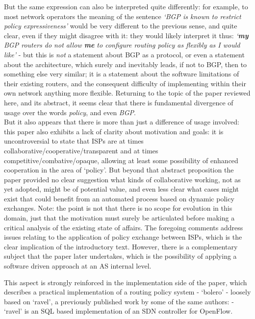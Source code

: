 But the same expression can also be interpreted quite differently: for example,
to most network operators the meaning of the sentence
\textit{`BGP is known to restrict policy expressiveness'}
would be very different to the previous sense, and quite clear, even if they
might disagree with it: they would likely interpret it thus:
\textit{`\textbf{my} BGP routers do not allow \textbf{me} to configure routing
	policy as flexibly as I would like'} - but this is \textit{not} a
statement
about BGP as a protocol, or even a statement about the architecture, which
surely and inevitably leads, if not to BGP, then to something else very
similar; it is a statement about the software limitations of their existing
routers, and the consequent difficulty of implementing within their own network
anything more flexible.
Returning to the topic of the paper reviewed here, and its abstract, it seems clear that
there is fundamental divergence of usage over the words \textit{policy}, and
even \textit{BGP}.
\\
But it also appears that there is more than just a difference of usage
involved: this paper also exhibits a lack of clarity about motivation and
goals: it is uncontroversial to state that ISPs are at times
collaborative/cooperative/transparent and at times
competitive/combative/opaque, allowing at least some possibility of enhanced
cooperation in the area of `policy'.
But beyond that abstract proposition the paper provided no clear suggestion
what kinds of collaborative working, not as yet adopted, might be of potential
value, and even less clear what cases might exist that could benefit from an
automated process based on dynamic policy exchanges.
Note: the point is not that there is no scope for evolution in this domain,
just that the motivation must surely be articulated before making a critical
analysis of the existing state of affairs.
The foregoing comments address issues relating to the application of policy
exchange between ISPs, which is the clear implication of the introductory text.
However, there is a complementary subject that the paper later undertakes,
which is the possibility of applying a software driven approach at an AS
internal level.

This aspect is strongly reinforced in the implementation side of the paper,
which describes a practical implementation of a routing policy system -
`bolero' - loosely based on `ravel', a previously published work by some of the
same authors: - `ravel' is an SQL based implementation of an SDN controller for
OpenFlow.
\\


